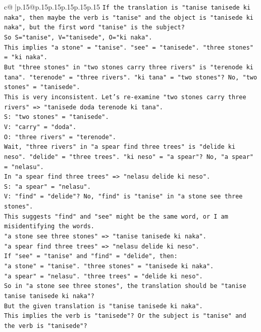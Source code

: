 \documentclass{article}
\begin{document}
{\begin{supertabular}{c@{$\;$}|p{.15\linewidth}@{}p{.15\linewidth}p{.15\linewidth}p{.15\linewidth}p{.15\linewidth}p{.15\linewidth}}
{{{\texttt{If the translation is "tanise tanisede ki naka", then maybe the verb is "tanise" and the object is "tanisede ki naka", but the first word "tanise" is the subject?} \\
\texttt{So S="tanise", V="tanisede", O="ki naka".} \\
\texttt{This implies "a stone" = "tanise". "see" = "tanisede". "three stones" = "ki naka".} \\
\texttt{But "three stones" in "two stones carry three rivers" is "terenode ki tana". "terenode" = "three rivers". "ki tana" = "two stones"? No, "two stones" = "tanisede".} \\
\texttt{This is very inconsistent. Let's re{-}examine "two stones carry three rivers" => "tanisede doda terenode ki tana".} \\
\texttt{S: "two stones" = "tanisede".} \\
\texttt{V: "carry" = "doda".} \\
\texttt{O: "three rivers" = "terenode".} \\
\texttt{Wait, "three rivers" in "a spear find three trees" is "delide ki neso". "delide" = "three trees". "ki neso" = "a spear"? No, "a spear" = "nelasu".} \\
\texttt{In "a spear find three trees" => "nelasu delide ki neso".} \\
\texttt{S: "a spear" = "nelasu".} \\
\texttt{V: "find" = "delide"? No, "find" is "tanise" in "a stone see three stones".} \\
\texttt{This suggests "find" and "see" might be the same word, or I am misidentifying the words.} \\
\texttt{"a stone see three stones" => "tanise tanisede ki naka".} \\
\texttt{"a spear find three trees" => "nelasu delide ki neso".} \\
\texttt{If "see" = "tanise" and "find" = "delide", then:} \\
\texttt{"a stone" = "tanise". "three stones" = "tanisede ki naka".} \\
\texttt{"a spear" = "nelasu". "three trees" = "delide ki neso".} \\
\texttt{So in "a stone see three stones", the translation should be "tanise tanise tanisede ki naka"?} \\
\texttt{But the given translation is "tanise tanisede ki naka".} \\
\texttt{This implies the verb is "tanisede"? Or the subject is "tanise" and the verb is "tanisede"?} \\
}}}
\end{supertabular}}
\end{document}
